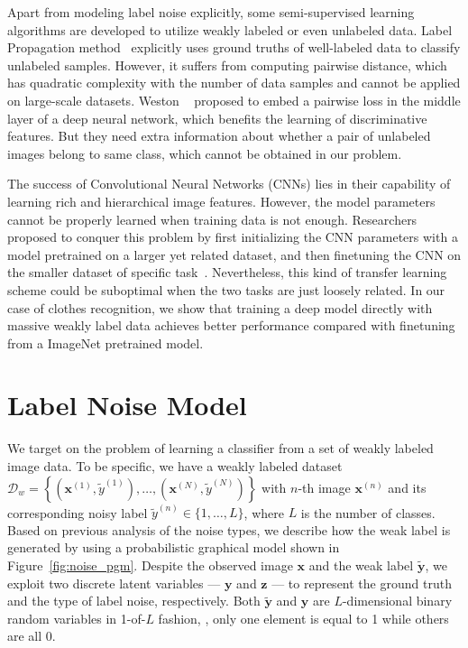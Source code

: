 \documentclass[10pt,twocolumn,letterpaper]{article}
\def\vec{\mathbf}
\begin{document}
Apart from modeling label noise explicitly, some semi-supervised learning algorithms are developed to utilize weakly labeled or even unlabeled data. Label Propagation method~\cite{zhu2002learning} explicitly uses ground truths of well-labeled data to classify unlabeled samples. However, it suffers from computing pairwise distance, which has quadratic complexity with the number of data samples and cannot be applied on large-scale datasets. Weston \etal~\cite{weston2012deep} proposed to embed a pairwise loss in the middle layer of a deep neural network, which benefits the learning of discriminative features. But they need extra information about whether a pair of unlabeled images belong to same class, which cannot be obtained in our problem.

The success of Convolutional Neural Networks (CNNs) lies in their capability of learning rich and hierarchical image features. However, the model parameters cannot be properly learned when training data is not enough. Researchers proposed to conquer this problem by first initializing the CNN parameters with a model pretrained on a larger yet related dataset, and then finetuning the CNN on the smaller dataset of specific task~\cite{krizhevsky2012imagenet,oquab2013learning,azizpour2014generic}. Nevertheless, this kind of transfer learning scheme could be suboptimal when the two tasks are just loosely related. In our case of clothes recognition, we show that training a deep model directly with massive weakly label data achieves better performance compared with finetuning from a ImageNet pretrained model.


\section{Label Noise Model} %
\label{sec:label_noise_model}
We target on the problem of learning a classifier from a set of weakly labeled image data. To be specific, we have a weakly labeled dataset $\mathcal{D}_w=\left\{\left(\vec{x}^{(1)}, \tilde{y}^{(1)}\right), \dots, \left(\vec{x}^{(N)}, \tilde{y}^{(N)}\right)\right\}$ with $n$-th image $\vec{x}^{(n)}$ and its corresponding noisy label $\tilde{y}^{(n)} \in \{1,\dots,L\}$, where $L$ is the number of classes. Based on previous analysis of the noise types, we describe how the weak label is generated by using a probabilistic graphical model shown in Figure~\ref{fig:noise_pgm}. Despite the observed image $\vec{x}$ and the weak label $\tilde{\vec{y}}$, we exploit two discrete latent variables --- $\vec{y}$ and $\vec{z}$ --- to represent the ground truth and the type of label noise, respectively. Both $\tilde{\vec{y}}$ and $\vec{y}$ are $L$-dimensional binary random variables in 1-of-$L$ fashion, \ie, only one element is equal to 1 while others are all 0.
\end{document}
